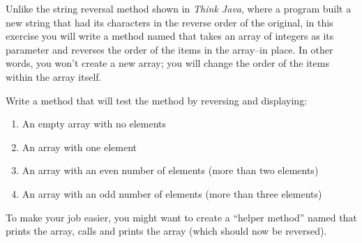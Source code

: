 \begin{exercise}
Unlike the string reversal method shown in {\em Think Java}, where a program built a new string that had its characters in the reverse order of the original, in this exercise you will write a  method named  that takes an array of integers as its parameter and reverses the order of the items in the array--in place. In other words, you won't create a new array; you will change the order of the items within the array itself.

Write a  method that will test the method by reversing and displaying:

\begin{enumerate}
\item An empty array with no elements
\item An array with one element
\item An array with an even number of elements (more than two elements)
\item An array with an odd number of elements (more than three elements)
\end{enumerate}

To make your job easier, you might want to create a ``helper method'' named  that prints the array, calls  and prints the array (which should now be reversed).
\end{exercise}

